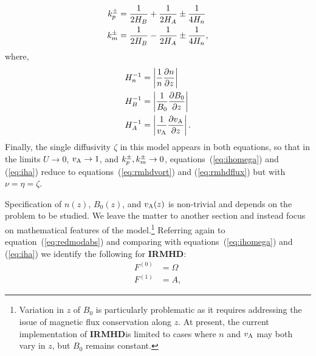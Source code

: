 \documentclass[12pt]{memoir}
\newcommand{\irmhd}{\textbf{IRMHD}}
\begin{document}
%
\begin{subequations}
\begin{align}
  k_p^\pm &=\frac{1}{2H_B} + \frac{1}{2H_A} \pm \frac{1}{4H_n} \label{eq:kppmdef} \\
  k_m^\pm &=\frac{1}{2H_B} - \frac{1}{2H_A} \pm \frac{1}{4H_n} \label{eq:kmpmdef},
\end{align}
\end{subequations}
%
where,
%
\begin{subequations}
\begin{align}
  H_n^{-1} &= \left|\frac{1}{n}\frac{\partial n}{\partial z}\right|                     \label{eq:defhr} \\
  H_B^{-1} &= \left|\frac{1}{B_0}\frac{\partial B_0}{\partial z}\right|                 \label{eq:defhb} \\
  H_A^{-1} &= \left|\frac{1}{v_{\mathrm{A}}}\frac{\partial v_{\mathrm{A}}}{\partial z}\right|. \label{eq:defha}
\end{align}
\end{subequations}
%
Finally, the single diffusivity $\zeta$ in this model appears in both
equations, so that in the limits $U\rightarrow 0$, $v_{\mathrm{A}}\rightarrow 1$,
and $k_p^\pm,k_m^\pm\rightarrow 0$, equations~(\ref{eq:ihomega}) and
(\ref{eq:iha}) reduce to equations~(\ref{eq:rmhdvort}) and (\ref{eq:rmhdflux})
but with $\nu=\eta=\zeta$.
%
\par
%
Specification of $n(z)$, $B_0(z)$, and $v_{\mathrm{A}}(z)$ is non-trivial
and depends on the problem to be studied. We leave the matter to another
section and instead focus on mathematical features of the 
model.\footnote{Variation in $z$ of $B_0$ is particularly problematic as
it requires addressing the issue of magnetic flux conservation along $z$.
At present, the current implementation of \irmhd is limited to cases where
$n$ and $v_{\mathrm{A}}$ may both vary in $z$, but $B_0$ remains constant.}
Referring again to equation~(\ref{eq:redmodabs}) and comparing with
equations~(\ref{eq:ihomega}) and (\ref{eq:iha}) we identify the 
following for \irmhd:
%
\begin{subequations}
\begin{align}
  F^{(0)} &= \Omega                                                                                   \label{eq:irmhdfzero} \\
  F^{(1)} &=  A,                                                                                      \label{eq:irmhdfone}
\end{align}
\end{subequations}
\end{document}
